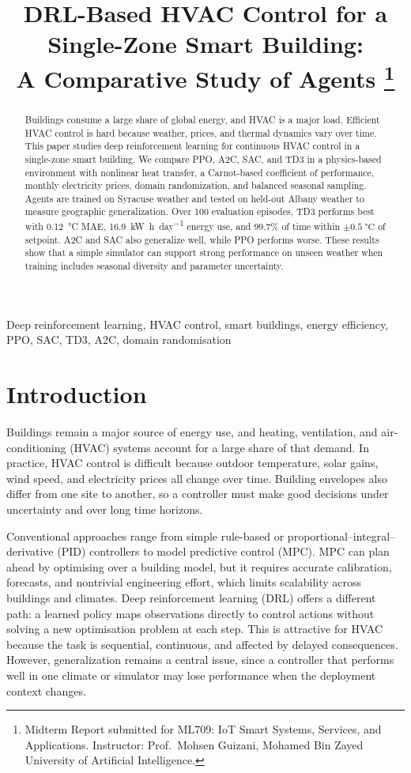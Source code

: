 \documentclass[conference]{IEEEtran}
\title{DRL-Based HVAC Control for a Single-Zone Smart Building:\\%
A Comparative Study of Agents%
\thanks{Midterm Report submitted for ML709: IoT Smart Systems, Services,
and Applications. Instructor: Prof.~Mohsen Guizani, Mohamed Bin Zayed
University of Artificial Intelligence.}}
\author{%
  \IEEEauthorblockN{%
    Saif Alkindi\IEEEauthorrefmark{1},~%
    Hamdan Alhadhrami\IEEEauthorrefmark{1},~%
    Khalfan Hableel\IEEEauthorrefmark{1}~and~%
    Ali Alharthi\IEEEauthorrefmark{1}%
  }
  \IEEEauthorblockA{%
    \IEEEauthorrefmark{1}Mohamed Bin Zayed University of Artificial Intelligence\\%
    Student IDs: 25011027,~25010875,~25011026,~22010335%
  }%
}
\begin{document}
\maketitle

\begin{abstract}
Buildings consume a large share of global energy, and HVAC is a major load. Efficient HVAC control is hard because weather, prices, and thermal dynamics vary over time. This paper studies deep reinforcement learning for continuous HVAC control in a single-zone smart building. We compare PPO, A2C, SAC, and TD3 in a physics-based environment with nonlinear heat transfer, a Carnot-based coefficient of performance, monthly electricity prices, domain randomization, and balanced seasonal sampling. Agents are trained on Syracuse weather and tested on held-out Albany weather to measure geographic generalization. Over 100 evaluation episodes, TD3 performs best with \SI{0.12}{\degreeCelsius} MAE, \SI{16.9}{\kilo\watt\hour\per day} energy use, and $99.7\%$ of time within $\pm\SI{0.5}{\degreeCelsius}$ of setpoint. A2C and SAC also generalize well, while PPO performs worse. These results show that a simple simulator can support strong performance on unseen weather when training includes seasonal diversity and parameter uncertainty.
\end{abstract}

\begin{IEEEkeywords}
Deep reinforcement learning, HVAC control, smart buildings, energy efficiency,
PPO, SAC, TD3, A2C, domain randomisation
\end{IEEEkeywords}

\section{Introduction}
\label{sec:introduction}
Buildings remain a major source of energy use, and heating, ventilation, and air-conditioning (HVAC) systems account for a large share of that demand. In practice, HVAC control is difficult because outdoor temperature, solar gains, wind speed, and electricity prices all change over time. Building envelopes also differ from one site to another, so a controller must make good decisions under uncertainty and over long time horizons.

Conventional approaches range from simple rule-based or proportional--integral--derivative (PID) controllers to model predictive control (MPC). MPC can plan ahead by optimising over a building model, but it requires accurate calibration, forecasts, and nontrivial engineering effort, which limits scalability across buildings and climates. Deep reinforcement learning (DRL) offers a different path: a learned policy maps observations directly to control actions without solving a new optimisation problem at each step. This is attractive for HVAC because the task is sequential, continuous, and affected by delayed consequences. However, generalization remains a central issue, since a controller that performs well in one climate or simulator may lose performance when the deployment context changes.
\end{document}
